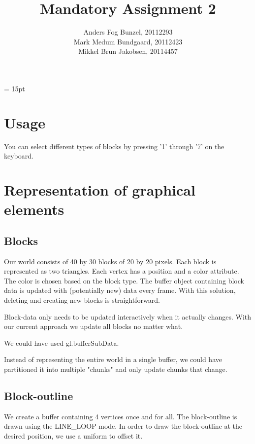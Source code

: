\documentclass[12pt,leqno]{article}
\begin{document}
\title{Mandatory Assignment 2} 
\author{Anders Fog Bunzel, 20112293\\ Mark Medum Bundgaard, 20112423\\Mikkel Brun Jakobsen, 20114457}

\maketitle

\headheight = 15pt
\thispagestyle{fancy} 
\pagestyle{fancy} \lhead{
\date{\today}}   

\section{Usage}
You can select different types of blocks by pressing '1' through '7' on the keyboard.

\section{Representation of graphical elements}

\subsection{Blocks}
Our world consists of 40 by 30 blocks of 20 by 20 pixels.
Each block is represented as two triangles.
Each vertex has a position and a color attribute. The color is chosen based on the block type.
The buffer object containing block data is updated with (potentially new) data every frame. With this solution, deleting and creating new blocks is straightforward.

Block-data only needs to be updated interactively when it actually changes. With our current approach we update all blocks no matter what.

We could have used gl.bufferSubData.

Instead of representing the entire world in a single buffer, we could have partitioned it into multiple "chunks" and only update chunks that change.

\subsection{Block-outline}
We create a buffer containing 4 vertices once and for all.
The block-outline is drawn using the LINE\_LOOP mode.
In order to draw the block-outline at the desired position, we use a uniform to offset it.
\end{document}

